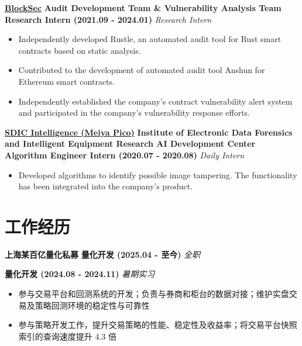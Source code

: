     \noindent \textbf{\href{https://blocksec.com}{BlockSec}} \textbar{} \textbf{Audit Development Team \& Vulnerability
    Analysis Team} \textbar{} \textbf{Research Intern (2021.09 - 2024.01)} \hfill \textsl{Research Intern}

    \begin{itemize}
        \item Independently developed Rustle, an automated audit tool for Rust smart contracts based on static
              analysis.
        \item Contributed to the development of automated audit tool Anshun for Ethereum smart contracts.
        \item Independently established the company's contract vulnerability alert system and participated in the
              company's vulnerability response efforts.
    \end{itemize}

    \noindent \textbf{\href{https://300188.cn}{SDIC Intelligence (Meiya Pico)}} \textbar{} \textbf{Institute of
    Electronic Data Forensics and Intelligent Equipment Research AI Development Center} \textbar{} \textbf{Algorithm
    Engineer Intern (2020.07 - 2020.08)} \hfill \textsl{Daily Intern}

    \begin{itemize}
        \item Developed algorithms to identify possible image tampering. The functionality has been integrated into the
              company's product.
    \end{itemize}

\else

    \section*{工作经历}

    \noindent \textbf{上海某百亿量化私募} \textbar{} \textbf{量化开发 (2025.04 - 至今)} \hfill \textsl{全职}

    \noindent \textbf{\phantom{上海某百亿量化私募}} \textbar{} \textbf{量化开发 (2024.08 - 2024.11)} \hfill \textsl{暑期实习}

    \begin{itemize}
        \item 参与交易平台和回测系统的开发；负责与券商和柜台的数据对接；维护实盘交易及策略回测环境的稳定性与可靠性
        \item 参与策略开发工作，提升交易策略的性能、稳定性及收益率；将交易平台快照索引的查询速度提升 4.3 倍
    \end{itemize}

